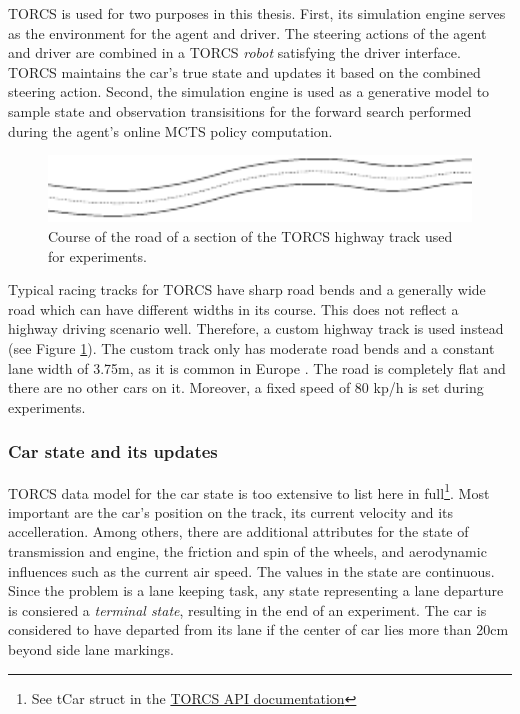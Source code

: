 TORCS is used for two purposes in this thesis. First, its simulation engine serves as the environment for the agent and driver. The steering actions of the agent and driver are combined in a TORCS \emph{robot} satisfying the driver interface. TORCS maintains the car's true state and updates it based on the combined steering action. Second, the simulation engine is used as a generative model to sample state and observation transisitions for the forward search performed during the agent's online MCTS policy computation.  
 
 
\begin{figure}[htbp]
    \centerfloat
    \includegraphics[width=1.0\textwidth]{figures/track.pdf}
    \caption{Course of the road of a section of the TORCS highway track used for experiments.}
    \label{fig:track}
\end{figure}

Typical racing tracks for TORCS have sharp road bends and a generally wide road which can have different widths in its course. This does not reflect a highway driving scenario well. Therefore, a custom highway track is used instead (see Figure \ref{fig:track}). The custom track only has moderate road bends and a constant lane width of 3.75m, as it is common in Europe \parencite{lane_width}. The road is completely flat and there are no other cars on it. Moreover, a fixed speed of 80 kp/h is set during experiments.

\subsubsection{Car state and its updates}
\label{sec:state}

TORCS data model for the car state is too extensive to list here in full\footnote{See tCar struct in the \href{https://sourceforge.net/projects/torcs/files/api-docs/}{TORCS API documentation}}. Most important are the car's position on the track, its current velocity and its accelleration. Among others, there are additional attributes for the state of transmission and engine, the friction and spin of the wheels, and aerodynamic influences such as the current air speed. The values in the state are continuous. Since the problem is a lane keeping task, any state representing a lane departure is consiered a \emph{terminal state}, resulting in the end of an experiment. The car is considered to have departed from its lane if the center of car lies more than 20cm beyond side lane markings.

